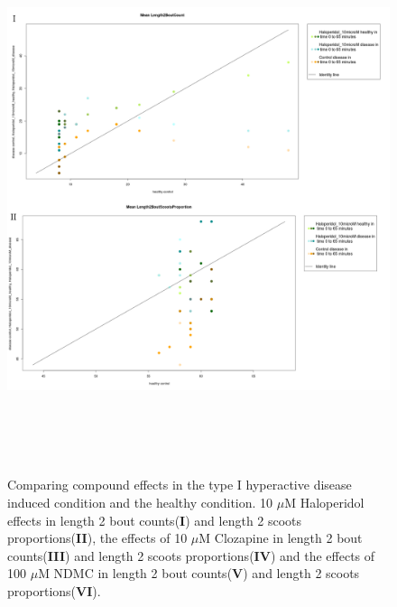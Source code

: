 \documentclass[a4paper,12pt]{article}
\begin{document}
\newpage
\begin{figure}[h!]
\begin{center}
\caption{Comparing compound effects in the type I hyperactive disease induced condition and the healthy condition. 10 $\mu$M Haloperidol effects in length 2 bout counts(\textbf{I}) and length 2 scoots proportions(\textbf{II}), the effects of 10 $\mu$M Clozapine in length 2 bout counts(\textbf{III}) and length 2 scoots proportions(\textbf{IV}) and the effects of 100 $\mu$M NDMC in length 2 bout counts(\textbf{V}) and length 2 scoots proportions(\textbf{VI}).}
\includegraphics[width=15cm,height=16cm]{ApoHighCountScootsH.png}
\end{center}
\end{figure}
\newpage
\end{document}
